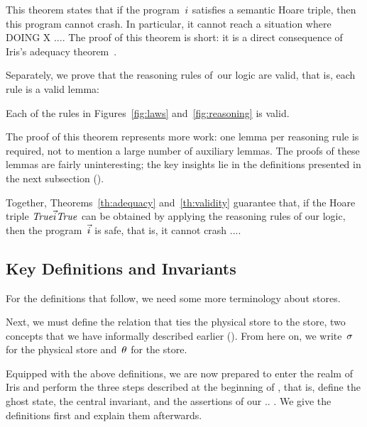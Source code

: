 This theorem states that if the program~$i$ satisfies a semantic Hoare
triple, then this program cannot crash. In
particular, it cannot reach a situation where DOING X ....
%
The proof of this theorem is short: it is a direct consequence of Iris's
adequacy theorem~\cite[\S6.4]{iris}.

Separately, we prove that the reasoning rules of~our logic are valid, that is,
each rule is a valid lemma:

\begin{theorem}
\label{th:validity}
  Each of the rules in Figures~\ref{fig:laws}
  and~\ref{fig:reasoning} is valid.
\end{theorem}

The proof of this theorem represents more work: one lemma per reasoning rule
is required, not to mention a large number of auxiliary lemmas. The proofs of
these lemmas are fairly uninteresting; the key insights lie in the definitions
presented in the next subsection ().

Together, Theorems~\ref{th:adequacy} and~\ref{th:validity} guarantee that, if
the Hoare triple $\mathit{True}\vec{i}\mathit{True}$ can be obtained by applying
the reasoning rules of our logic, then the program~$\vec{i}$ is safe, that is, it cannot crash ....

\subsection{Key Definitions and Invariants}
\label{sec:invariant}

For the definitions that follow, we need some more terminology about stores.

Next, we must define the relation that ties the physical store to the
\logical store, two concepts that we have informally described earlier
(). From here on, we write~$\sigma$ for the physical
store and~$\theta$ for the \logical store.

Equipped with the above definitions, we are now prepared to enter the realm of
Iris and perform the three steps described at the beginning of
, that is, define the ghost state, the central invariant,
and the assertions of our .. . We give the definitions first and explain them
afterwards.

